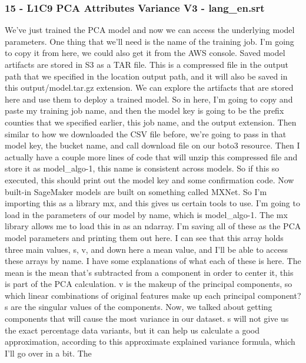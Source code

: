 \hypertarget{l1c9-pca-attributes-variance-v3---lang_en.srt}{%
\subsubsection{15 - L1C9 PCA Attributes Variance V3 -
lang\_en.srt}\label{l1c9-pca-attributes-variance-v3---lang_en.srt}}

We've just trained the PCA model and now we can access the underlying
model parameters. One thing that we'll need is the name of the training
job. I'm going to copy it from here, we could also get it from the AWS
console. Saved model artifacts are stored in S3 as a TAR file. This is a
compressed file in the output path that we specified in the location
output path, and it will also be saved in this output/model.tar.gz
extension. We can explore the artifacts that are stored here and use
them to deploy a trained model. So in here, I'm going to copy and paste
my training job name, and then the model key is going to be the prefix
counties that we specified earlier, this job name, and the output
extension. Then similar to how we downloaded the CSV file before, we're
going to pass in that model key, the bucket name, and call download file
on our boto3 resource. Then I actually have a couple more lines of code
that will unzip this compressed file and store it as model\_algo-1, this
name is consistent across models. So if this so executed, this should
print out the model key and some confirmation code. Now built-in
SageMaker models are built on something called MXNet. So I'm importing
this as a library mx, and this gives us certain tools to use. I'm going
to load in the parameters of our model by name, which is model\_algo-1.
The mx library allows me to load this in as an ndarray. I'm saving all
of these as the PCA model parameters and printing them out here. I can
see that this array holds three main values, s, v, and down here a mean
value, and I'll be able to access these arrays by name. I have some
explanations of what each of these is here. The mean is the mean that's
subtracted from a component in order to center it, this is part of the
PCA calculation. v is the makeup of the principal components, so which
linear combinations of original features make up each principal
component? s are the singular values of the components. Now, we talked
about getting components that will cause the most variance in our
dataset. s will not give us the exact percentage data variants, but it
can help us calculate a good approximation, according to this
approximate explained variance formula, which I'll go over in a bit. The
